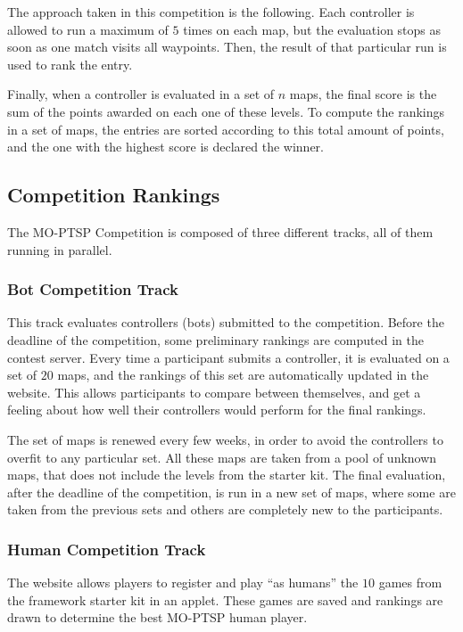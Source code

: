 \documentclass[conference]{IEEEtran}
\begin{document}
The approach taken in this competition is the following. Each controller is allowed to run a maximum of $5$ times on each map, but the evaluation stops as soon as one match visits all waypoints. Then, the result of that particular run is used to rank the entry.

Finally, when a controller is evaluated in a set of $n$ maps, the final score is the sum of the points awarded on each one of these levels. To compute the rankings in a set of maps, the entries are sorted according to this total amount of points, and the one with the highest score is declared the winner.
	
	
\subsection{Competition Rankings}

The MO-PTSP Competition is composed of three different tracks, all of them running in parallel.

\subsubsection{Bot Competition Track} This track evaluates controllers (bots) submitted to the competition. Before the deadline of the competition, some preliminary rankings are computed in the contest server. Every time a participant submits a controller, it is evaluated on a set of $20$ maps, and the rankings of this set are automatically updated in the website. This allows participants to compare between themselves, and get a feeling about how well their controllers would perform for the final rankings.

The set of maps is renewed every few weeks, in order to avoid the controllers to overfit to any particular set. All these maps are taken from a pool of unknown maps, that does not include the levels from the starter kit. The final evaluation, after the deadline of the competition, is run in a new set of maps, where some are taken from the previous sets and others are completely new to the participants.

\subsubsection{Human Competition Track} The website allows players to register and play ``as humans'' the $10$ games from the framework starter kit in an applet. These games are saved and rankings are drawn to determine the best MO-PTSP human player.
\end{document}
